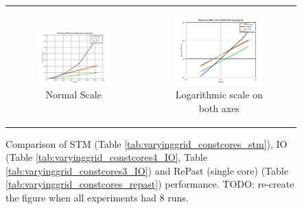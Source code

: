 \begin{figure}
\begin{center}
	\begin{tabular}{c c}
		\begin{subfigure}[b]{0.5\textwidth}
			\centering
			\includegraphics[width=1\textwidth, angle=0]{./fig/sir/stm_io_repast_varyinggrid_performance.png}
			\caption{Normal Scale}
		\end{subfigure}
    	&
		\begin{subfigure}[b]{0.5\textwidth}
			\centering
			\includegraphics[width=1\textwidth, angle=0]{./fig/sir/stm_io_repast_varyinggrid_performance_loglog.png}
			\caption{Logarithmic scale on both axes}
		\end{subfigure}
    \end{tabular}
	\caption{Comparison of STM (Table \ref{tab:varyinggrid_constcores_stm}), IO (Table \ref{tab:varyinggrid_constcores4_IO}, Table 					\ref{tab:varyinggrid_constcores3_IO}) and RePast (single core) (Table \ref{tab:varyinggrid_constcores_repast}) performance. TODO: re-create the figure when all experiments had 8 runs.}
	\label{fig:stm_io_repast_varyinggrid_performance}
\end{center}
\end{figure}

